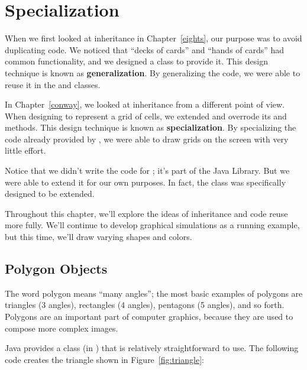 \chapter{Specialization}


When we first looked at inheritance in Chapter~\ref{eights}, our purpose was to avoid duplicating code.
We noticed that ``decks of cards'' and ``hands of cards'' had common functionality, and we designed a  class to provide it.
This design technique is known as {\bf generalization}.
By generalizing the code, we were able to reuse it in the  and  classes.

In Chapter~\ref{conway}, we looked at inheritance from a different point of view.
When designing  to represent a grid of cells, we extended  and overrode its  and  methods.
This design technique is known as {\bf specialization}.
By specializing the code already provided by , we were able to draw grids on the screen with very little effort.

Notice that we didn't write the code for ; it's part of the Java Library.
But we were able to extend it for our own purposes.
In fact, the  class was specifically designed to be extended.

Throughout this chapter, we'll explore the ideas of inheritance and code reuse more fully.
We'll continue to develop graphical simulations as a running example, but this time, we'll draw varying shapes and colors.


\section{Polygon Objects}

The word polygon means ``many angles''; the most basic examples of polygons are triangles (3 angles), rectangles (4 angles), pentagons (5 angles), and so forth.
Polygons are an important part of computer graphics, because they are used to compose more complex images.

Java provides a  class (in ) that is relatively straightforward to use.
The following code creates the triangle shown in Figure~\ref{fig:triangle}:

